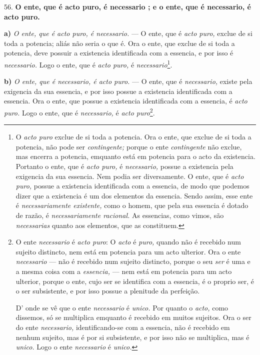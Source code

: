  56. \textbf{O ente, que é acto puro, é necessario ; e o ente, que é necessario, é acto puro.}

\textbf{a)} \emph{O ente, que é acto puro, é necessario.} --- O ente, que é \emph{acto puro,} exclue de si toda a potencia; aliás não seria o que é. Ora o ente, que exclue de si toda a potencia, deve possuir a existencia identificada com a essencia, e por isso é \emph{necessario.} Logo o ente, que é \emph{acto puro,} é \emph{necessario}\footnote{O \emph{acto puro} exclue de si toda a potencia. Ora o ente, que exclue de si toda a potencia, não pode ser \emph{contingente;} porque o ente \emph{contingente} não exclue, mas encerra a potencia, emquanto está em potencia para o acto da existencia. Portanto o ente, que é \emph{acto puro,} é \emph{necessario,} possue a existencia pela exigencia da sua essencia. Nem podia ser diversamente. O ente, que é \emph{acto puro,} possue a existencia identificada com a essencia, de modo que podemos dizer que a existencia é um dos elementos da essencia. Sendo assim, esse ente é \emph{necessariamente existente,} como o homem, que pela sua essencia é dotado de razão, é \emph{necessariamente racional.} As essencias, como vimos, são \emph{necessarias} quanto aos elementos, que as constituem.}.

\textbf{b)} \emph{O ente, que é necessario, é acto puro.} --- O ente, que é \emph{necessario,} existe pela exigencia da sua essencia, e por isso possue a existencia identificada com a essencia. Ora o ente, que possue a existencia identificada com a essencia, é \emph{acto puro.} Logo o ente, que é \emph{necessario,} é \emph{acto puro}\footnote{O ente \emph{necessario} é \emph{acto puro}: O \emph{acto} é \emph{puro,} quando não é recebido num sujeito distincto, nem está em potencia para um acto ulterior. Ora o ente \emph{necessario} --- não é recebido num sujeito distincto, porque o seu \emph{ser} é uma e a mesma coisa com a \emph{essencia,} --- nem está em potencia para um acto ulterior, porque o ente, cujo ser se identifica com a essencia, é o proprio ser, é o ser subsistente, e por isso possue a plenitude da perfeição.\par D' onde se vê que o ente \emph{necessario} é \emph{unico.} Por quanto o \emph{acto,} como dissemos, só se multiplica emquanto é recebido em muitos sujeitos. Ora o ser do ente \emph{necessario,} identificando-se com a essencia, não é recebido em nenhum sujeito, mas é por si subsistente, e por isso não se multiplica, mas é \emph{unico.} Logo o ente \emph{necessario} é \emph{unico.}}.

